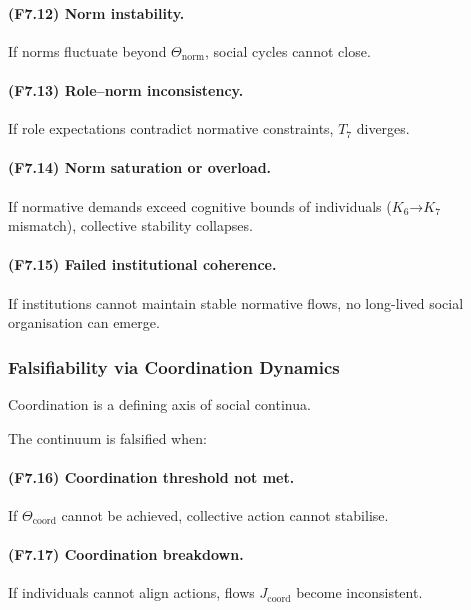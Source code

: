 \paragraph{(F7.12) Norm instability.}
If norms fluctuate beyond $\Theta_{\mathrm{norm}}$,
social cycles cannot close.

\paragraph{(F7.13) Role–norm inconsistency.}
If role expectations contradict normative constraints,
$T_7$ diverges.

\paragraph{(F7.14) Norm saturation or overload.}
If normative demands exceed cognitive bounds of individuals
($K_6$→$K_7$ mismatch),
collective stability collapses.

\paragraph{(F7.15) Failed institutional coherence.}
If institutions cannot maintain stable normative flows,
no long-lived social organisation can emerge.



\subsubsection{Falsifiability via Coordination Dynamics}

Coordination is a defining axis of social continua.

The continuum is falsified when:

\paragraph{(F7.16) Coordination threshold not met.}
If $\Theta_{\mathrm{coord}}$ cannot be achieved,
collective action cannot stabilise.

\paragraph{(F7.17) Coordination breakdown.}
If individuals cannot align actions,
flows $J_{\mathrm{coord}}$ become inconsistent.

